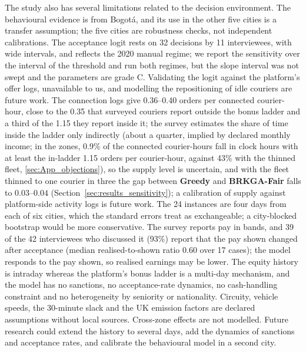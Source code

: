 \documentclass[a4paper,11pt,review,3p,authoryear]{elsarticle}
\begin{document}
The study also has several limitations related to the decision environment. The behavioural evidence is from Bogot\'a, and its use in the other five cities is a transfer assumption; the five cities are robustness checks, not independent calibrations. The acceptance logit rests on 32 decisions by 11 interviewees, with wide intervals, and reflects the 2020 manual regime; we report the sensitivity over the interval of the threshold and run both regimes, but the slope interval was not swept and the parameters are grade C. Validating the logit against the platform's offer logs, unavailable to us, and modelling the repositioning of idle couriers are future work. The connection logs give 0.36--0.40 orders per connected courier-hour, close to the 0.35 that surveyed couriers report outside the bonus ladder and a third of the 1.15 they report inside it; the survey estimates the share of time inside the ladder only indirectly (about a quarter, implied by declared monthly income; in the zones, 0.9\% of the connected courier-hours fall in clock hours with at least the in-ladder 1.15 orders per courier-hour, against 43\% with the thinned fleet, \ref{sec:App_objections}), so the supply level is uncertain, and with the fleet thinned to one courier in three the gap between \textbf{Greedy} and \textbf{BRKGA-Fair} falls to $0.03$--$0.04$ (Section~\ref{sec:results_sensitivity}); a calibration of supply against platform-side activity logs is future work. The 24 instances are four days from each of six cities, which the standard errors treat as exchangeable; a city-blocked bootstrap would be more conservative. The survey reports pay in bands, and 39 of the 42 interviewees who discussed it (93\%) report that the pay shown changed after acceptance (median realised-to-shown ratio 0.60 over 17 cases); the model responds to the pay shown, so realised earnings may be lower. The equity history is intraday whereas the platform's bonus ladder is a multi-day mechanism, and the model has no sanctions, no acceptance-rate dynamics, no cash-handling constraint and no heterogeneity by seniority or nationality. Circuity, vehicle speeds, the 30-minute slack and the UK emission factors are declared assumptions without local sources. Cross-zone effects are not modelled. Future research could extend the history to several days, add the dynamics of sanctions and acceptance rates, and calibrate the behavioural model in a second city.
\end{document}
